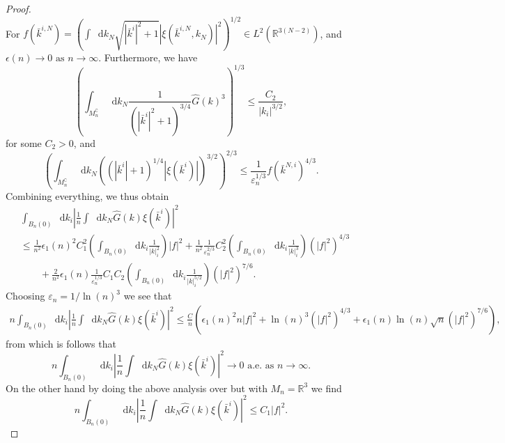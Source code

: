 \documentclass[a4paper,11pt]{article}
\newcommand{\abs}[1]{\left\lvert #1 \right\rvert}
\newcommand*\diff{\mathop{}\!\mathrm{d}}
\newcommand{\R}{\mathbb{R}}
\numberwithin{equation}{section}
\begin{document}
\begin{proof}
\begin{equation}
	\end{equation}
	For $ f(\bar{k}^{i,N})=\left(\int\diff k_N\sqrt{\abs{\bar{k}^i}^2+1}\abs{\xi(\bar{k}^{i,N},k_N)}^2\right)^{1/2}\in L^2(\R^{3(N-2)})$, and $ \epsilon(n)\to0\text{ as }n\to\infty $. Furthermore, we have \begin{equation}
	\left(\int_{M_n^\complement} \diff k_N\frac{1}{\left(\abs{\bar{k}^i}^2+1\right)^{3/4}}\hat{G}(k)^3\right)^{1/3}\leq\frac{C_2}{\abs{k_i}^{3/2}},
	\end{equation}
	for some $ C_2>0 $, and \begin{equation}
	\left(\int_{M_n^\complement} \diff k_N\left(\left(\abs{\bar{k}^i}+1\right)^{1/4}\abs{\xi(\bar{k}^i)}\right)^{3/2}\right)^{2/3}\leq\frac{1}{\varepsilon_n^{1/3}}f(\bar{k}^{N,i})^{4/3}.
	\end{equation}
	Combining everything, we thus obtain\begin{equation}
	\begin{aligned}
	&\int_{B_n(0)}\diff k_i\left\lvert\frac{1}{n}\int \diff k_N\hat{G}(k)\xi(\bar{k}^i)\right\rvert^2\\&\leq\frac{1}{n^2}\epsilon_1(n)^2C_1^2\left(\int_{B_n(0)}\diff k_i\frac{1}{\abs{k}_i^2}\right)\abs{f}^2+\frac{1}{n^2}\frac{1}{\varepsilon_n^{2/3}}C_2^2\left(\int_{B_n(0)}\diff k_i\frac{1}{\abs{k}_i^3}\right)(\abs{f}^2)^{4/3}\\&\qquad+\frac{2}{n^2}\epsilon_1(n)\frac{1}{\varepsilon_n^{1/3}}C_1C_2\left(\int_{B_n(0)}\diff k_i\frac{1}{\abs{k}_i^{5/2}}\right)(\abs{f}^2)^{7/6}.
	\end{aligned}
	\end{equation}
	Choosing $ \varepsilon_n=1/\ln(n)^3 $ we see that \begin{equation}
	\begin{aligned}
	n\int_{B_n(0)}\diff k_i\left\lvert\frac{1}{n}\int \diff k_N\hat{G}(k)\xi(\bar{k}^i)\right\rvert^2\leq\frac{C}{n}\left(\epsilon_1(n)^2n\abs{f}^2+\ln(n)^3(\abs{f}^2)^{4/3}+\epsilon_1(n)\ln(n)\sqrt{n}(\abs{f}^2)^{7/6}\right),
	\end{aligned}
	\end{equation}
	from which is follows that \begin{equation}
	n\int_{B_n(0)}\diff k_i\left\lvert\frac{1}{n}\int \diff k_N\hat{G}(k)\xi(\bar{k}^i)\right\rvert^2\to0\text{ a.e. as }n\to\infty.
	\end{equation}
	On the other hand by doing the above analysis over but with $ M_n=\R^3 $ we find \begin{equation}
	n\int_{B_n(0)}\diff k_i\left\lvert\frac{1}{n}\int \diff k_N\hat{G}(k)\xi(\bar{k}^i)\right\rvert^2\leq C_1\abs{f}^2.

\end{equation}
\end{proof}
\end{document}
